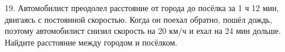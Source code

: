 19. Автомобилист преодолел расстояние от города до посёлка за 1 ч 12 мин, двигаясь с постоянной скоростью. Когда он поехал обратно, пошёл дождь, поэтому автомобилист снизил скорость на 20 км/ч и ехал на 24 мин дольше. Найдите расстояние между городом и посёлком.\\
